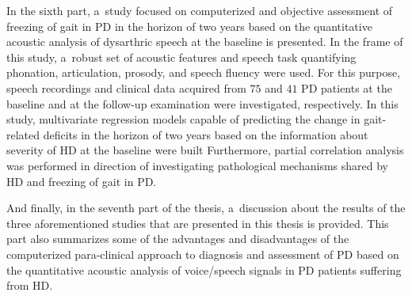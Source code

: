 In the sixth part, a~study focused on computerized and objective assessment of freezing of gait in PD in the horizon of two years based on the quantitative acoustic analysis of dysarthric speech at the baseline is presented. In the frame of this study, a~robust set of acoustic features and speech task quantifying phonation, articulation, prosody, and speech fluency were used. For this purpose, speech recordings and clinical data acquired from $75$ and $41$ PD patients at the baseline and at the follow-up examination were investigated, respectively. In this study, multivariate regression models capable of predicting the change in gait-related deficits in the horizon of two years based on the information about severity of HD at the baseline were built Furthermore, partial correlation analysis was performed in direction of investigating pathological mechanisms shared by HD and freezing of gait in PD.

And finally, in the seventh part of the thesis, a~discussion about the results of the three aforementioned studies that are presented in this thesis is provided. This part also summarizes some of the advantages and disadvantages of the computerized para-clinical approach to diagnosis and assessment of PD based on the quantitative acoustic analysis of voice/speech signals in PD patients suffering from HD.

